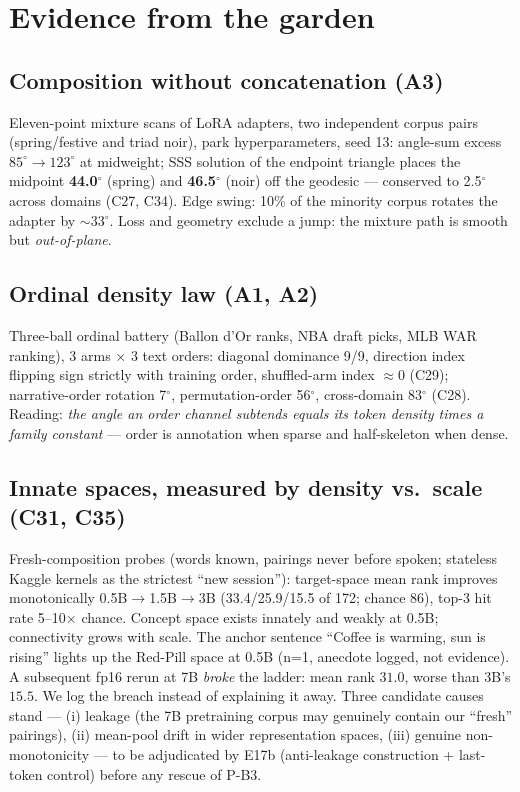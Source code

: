 \documentclass[11pt]{article}
\begin{document}
\section{Evidence from the garden}
\subsection{Composition without concatenation (A3)}
Eleven-point mixture scans of LoRA adapters, two independent corpus pairs
(spring/festive and triad noir), park hyperparameters, seed 13:
angle-sum excess $85^\circ\!\to\!123^\circ$ at midweight; SSS solution of the
endpoint triangle places the midpoint \textbf{44.0$^\circ$} (spring) and \textbf{46.5$^\circ$}
(noir) off the geodesic --- conserved to 2.5$^\circ$ across domains (C27, C34).
Edge swing: 10\% of the minority corpus rotates the adapter by $\sim$33$^\circ$.
Loss and geometry exclude a jump: the mixture path is smooth but \emph{out-of-plane}.

\subsection{Ordinal density law (A1, A2)}
Three-ball ordinal battery (Ballon d'Or ranks, NBA draft picks, MLB WAR ranking),
3 arms $\times$ 3 text orders: diagonal dominance 9/9, direction index flipping
sign strictly with training order, shuffled-arm index $\approx 0$ (C29);
narrative-order rotation 7$^\circ$, permutation-order 56$^\circ$, cross-domain 83$^\circ$
(C28). Reading: \emph{the angle an order channel subtends equals its token density
times a family constant} --- order is annotation when sparse and half-skeleton when dense.

\subsection{Innate spaces, measured by density vs.\ scale (C31, C35)}
Fresh-composition probes (words known, pairings never before spoken; stateless
Kaggle kernels as the strictest ``new session''): target-space mean rank improves
monotonically 0.5B$\to$1.5B$\to$3B (33.4/25.9/15.5 of 172; chance 86), top-3 hit rate
5--10$\times$ chance. Concept space exists innately and weakly at 0.5B; connectivity
grows with scale. The anchor sentence ``Coffee is warming, sun is rising'' lights up
the Red-Pill space at 0.5B (n=1, anecdote logged, not evidence).
A subsequent fp16 rerun at 7B \emph{broke} the ladder: mean rank $31.0$, worse than 3B's $15.5$. We log the breach instead of explaining it away. Three candidate causes stand --- (i) leakage (the 7B pretraining corpus may genuinely contain our ``fresh'' pairings), (ii) mean-pool drift in wider representation spaces, (iii) genuine non-monotonicity --- to be adjudicated by E17b (anti-leakage construction + last-token control) before any rescue of P-B3.
\end{document}
